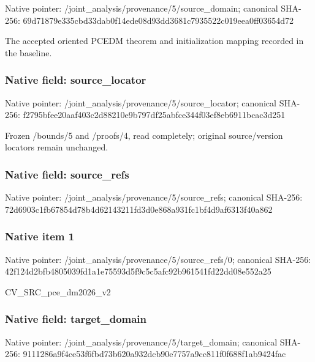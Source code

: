\documentclass[10pt,a4paper]{article}
\begin{document}
Native pointer: /joint\_analysis/provenan\allowbreak{}ce/5/source\_domain; canonical SHA-256: 69d71879e335cbd33dab0f14\allowbreak{}ede08d93dd3681c7935522c0\allowbreak{}19eea0ff03654d72


The accepted oriented PCEDM theorem and initialization mapping recorded in the baseline.


\subsubsection{Native field: source\_locator}


Native pointer: /joint\_analysis/provenan\allowbreak{}ce/5/source\_locator; canonical SHA-256: f2795bfee20aaf403c2d8821\allowbreak{}0e9b797df25abfce344f03ef\allowbreak{}8eb6911bcac3d251


Frozen /bounds/5 and /proofs/4, read completely; original source/version locators remain unchanged.


\subsubsection{Native field: source\_refs}


Native pointer: /joint\_analysis/provenan\allowbreak{}ce/5/source\_refs; canonical SHA-256: 72d6903c1fb67854d78b4d62\allowbreak{}143211fd3d0e868a931fc1bf\allowbreak{}4d9af6313f40a862



\subsubsection{Native item 1}


Native pointer: /joint\_analysis/provenan\allowbreak{}ce/5/source\_refs/0; canonical SHA-256: 42f124d2bfb4805039fd1a1e\allowbreak{}75593d5f9c5c5afc92b96154\allowbreak{}1fd22dd08e552a25


CV\_SRC\_pce\_dm2026\_v2


\subsubsection{Native field: target\_domain}


Native pointer: /joint\_analysis/provenan\allowbreak{}ce/5/target\_domain; canonical SHA-256: 9111286a9f4ce53f6fbd73b6\allowbreak{}20a932dcb90e7757a9cc811f\allowbreak{}0f688f1ab9424fac
\end{document}
